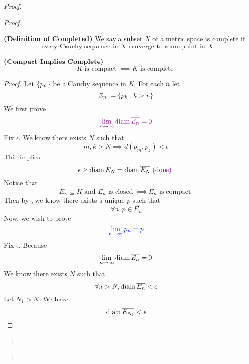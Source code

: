 \documentclass{report}
\begin{document}
\begin{proof}
\begin{proof}
\begin{definition}
\label{3.9.7}
\textbf{(Definition of Completed)} We say a subset $X$ of a metric space is complete if 
\begin{equation}
\text{ every Cauchy sequence in $X$ converge to some point in $X$}
\end{equation}
\end{definition}
\begin{theorem}
\label{3.9.8}
\textbf{(Compact Implies Complete)} 
\begin{equation}
K\text{ is compact }\implies K\text{ is complete }
\end{equation}
\end{theorem}
\begin{proof}
Let $\{ p_n \}$ be a Cauchy sequence in $K$. For each $n$ let
 \begin{equation}
E_n:=\{ p_k:k> n \}
\end{equation}
We first prove 
\begin{equation}
  \textcolor{violet}{\lim_{n\to\infty}\text{diam}\, \overline{E_n}=0}
\end{equation}
Fix $\epsilon $. We know there exists $N$ such that
 \begin{equation}
m,k>N\implies d(p_m,p_k)<\epsilon 
\end{equation}
This implies
\begin{equation}
\epsilon \geq \text{diam}\, E_N=\text{diam}\, \overline{E_N}\textcolor{violet}{\text{ (done) }}
\end{equation}
Notice that
\begin{equation}
\overline{E_n}\subseteq K\text{ and }\overline{E_n}\text{ is closed }\implies \overline{E_n}\text{ is compact }
\end{equation}
Then by , we know there exists a unique $p$ such that
 \begin{equation}
\forall n, p\in  \overline{E_n}
\end{equation}
Now, we wish to prove
\begin{equation}
  \textcolor{blue}{\lim_{n\to\infty}p_n=p}
\end{equation}
Fix $\epsilon $. Because
\begin{equation} \lim_{n\to\infty}\text{diam}\, \overline{E_n}=0
\end{equation}
We know there exists $N$ such that
 \begin{equation}
\forall n>N, \text{diam}\, \overline{E_n}<\epsilon 
\end{equation}
Let $N_1>N$. We have
 \begin{equation}
\diam{\overline{E_{N_1}}}<\epsilon 

\end{equation}
\end{proof}
\end{proof}
\end{proof}
\end{document}
